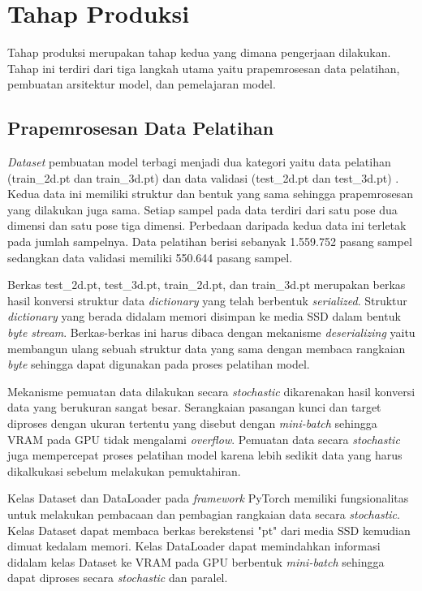 \section{Tahap Produksi} \label{sec:3-TahapProduksi}

Tahap produksi merupakan tahap kedua yang dimana pengerjaan dilakukan. Tahap ini terdiri dari
tiga langkah utama yaitu prapemrosesan data pelatihan, pembuatan arsitektur model, dan pemelajaran model.


\subsection{Prapemrosesan Data Pelatihan}

\textit{Dataset} pembuatan model terbagi menjadi dua kategori yaitu data pelatihan
(train\_2d.pt dan train\_3d.pt) dan data validasi (test\_2d.pt dan test\_3d.pt) .
Kedua data ini memiliki struktur dan bentuk yang sama sehingga prapemrosesan yang dilakukan juga sama.
Setiap sampel pada data terdiri dari satu pose dua dimensi dan satu pose tiga dimensi.
Perbedaan daripada kedua data ini terletak pada jumlah sampelnya. Data pelatihan berisi sebanyak
1.559.752 pasang sampel sedangkan data validasi memiliki 550.644 pasang sampel.

Berkas test\_2d.pt, test\_3d.pt, train\_2d.pt, dan train\_3d.pt merupakan berkas hasil konversi
struktur data \textit{dictionary} yang telah berbentuk \textit{serialized}.
Struktur \textit{dictionary} yang berada didalam memori disimpan ke media SSD dalam bentuk \textit{byte stream}.
Berkas-berkas ini harus dibaca dengan mekanisme \textit{deserializing} yaitu membangun ulang sebuah
struktur data yang sama dengan membaca rangkaian \textit{byte} sehingga dapat digunakan pada proses pelatihan model.

Mekanisme pemuatan data dilakukan secara \textit{stochastic} dikarenakan hasil konversi data yang
berukuran sangat besar. Serangkaian pasangan kunci dan target diproses dengan ukuran tertentu
yang disebut dengan \textit{mini-batch} sehingga
VRAM pada GPU tidak mengalami \textit{overflow}. Pemuatan data secara \textit{stochastic} juga
mempercepat proses pelatihan model karena lebih sedikit data yang harus dikalkukasi sebelum melakukan
pemuktahiran.

Kelas Dataset dan DataLoader pada \textit{framework} PyTorch memiliki fungsionalitas untuk melakukan
pembacaan dan pembagian rangkaian data secara \textit{stochastic}. Kelas Dataset dapat membaca berkas
berekstensi "pt" dari media SSD kemudian dimuat kedalam memori. Kelas DataLoader dapat memindahkan
informasi didalam kelas Dataset ke VRAM pada GPU berbentuk \textit{mini-batch} sehingga dapat diproses secara
\textit{stochastic} dan paralel.

